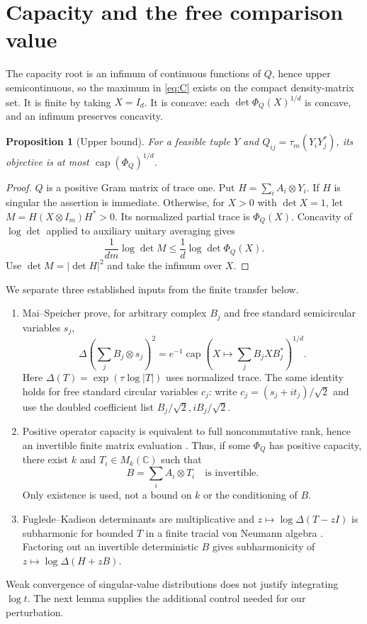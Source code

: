 \documentclass[11pt]{article}
\newtheorem{proposition}[theorem]{Proposition}
\newcommand{\C}{\mathbb C}
\newcommand{\capop}{\operatorname{cap}}
\begin{document}
\section{Capacity and the free comparison value}
The capacity root is an infimum of continuous functions of $Q$, hence upper semicontinuous, so the maximum in \eqref{eq:C} exists on the compact density-matrix set. It is finite by taking $X=I_d$. It is concave: each $\det\Phi_Q(X)^{1/d}$ is concave, and an infimum preserves concavity.
\begin{proposition}[Upper bound]\label{prop:upper}
For a feasible tuple $Y$ and $Q_{ij}=\tau_m(Y_iY_j^*)$, its objective is at most $\capop(\Phi_Q)^{1/d}$.
\end{proposition}
\begin{proof}
$Q$ is a positive Gram matrix of trace one. Put $H=\sum_i A_i\otimes Y_i$. If $H$ is singular the assertion is immediate. Otherwise, for $X>0$ with $\det X=1$, let $M=H(X\otimes I_m)H^*>0$. Its normalized partial trace is $\Phi_Q(X)$. Concavity of $\log\det$ applied to auxiliary unitary averaging gives
\[
 \frac1{dm}\log\det M\le\frac1d\log\det\Phi_Q(X).
\]
Use $\det M=|\det H|^2$ and take the infimum over $X$.
\end{proof}
We separate three established inputs from the finite transfer below.
\begin{enumerate}
\item Mai--Speicher \cite[Theorem 1.2]{ms} prove, for arbitrary complex $B_j$ and free standard semicircular variables $s_j$,
\begin{equation}\label{eq:MS}
 \Delta\left(\sum_jB_j\otimes s_j\right)^2
 =e^{-1}\capop\left(X\mapsto\sum_jB_jXB_j^*\right)^{1/d}.
\end{equation}
Here $\Delta(T)=\exp(\tau\log|T|)$ uses normalized trace. The same identity holds for free standard circular variables $c_j$: write $c_j=(s_j+it_j)/\sqrt2$ and use the doubled coefficient list $B_j/\sqrt2,iB_j/\sqrt2$.
\item Positive operator capacity is equivalent to full noncommutative rank, hence an invertible finite matrix evaluation \cite{ggow}. Thus, if some $\Phi_Q$ has positive capacity, there exist $k$ and $T_i\in M_k(\C)$ such that
\begin{equation}\label{eq:B}
 B=\sum_i A_i\otimes T_i\quad\text{is invertible}.
\end{equation}
Only existence is used, not a bound on $k$ or the conditioning of $B$.
\item Fuglede--Kadison determinants are multiplicative and $z\mapsto\log\Delta(T-zI)$ is subharmonic for bounded $T$ in a finite tracial von Neumann algebra \cite{hs}. Factoring out an invertible deterministic $B$ gives subharmonicity of $z\mapsto\log\Delta(H+zB)$.
\end{enumerate}
Weak convergence of singular-value distributions does not justify integrating $\log t$. The next lemma supplies the additional control needed for our perturbation.
\end{document}
